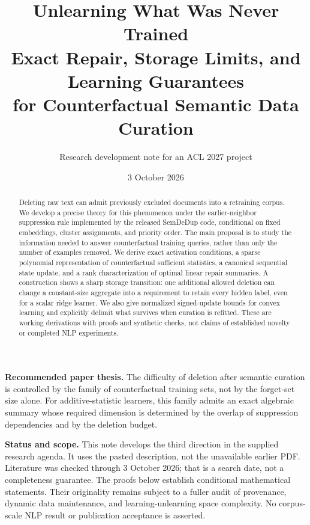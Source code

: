 \documentclass[11pt,a4paper]{article}
\title{\color{ink}\textbf{Unlearning What Was Never Trained}\\[5pt]\Large Exact Repair, Storage Limits, and Learning Guarantees\\for Counterfactual Semantic Data Curation}
\author{Research development note for an ACL 2027 project}
\date{3 October 2026}
\theoremstyle{definition}\newtheorem{definition}[theorem]{Definition}
\begin{document}
\maketitle
\begin{abstract}
Deleting raw text can admit previously excluded documents into a retraining corpus. We develop a precise theory for this phenomenon under the earlier-neighbor suppression rule implemented by the released SemDeDup code, conditional on fixed embeddings, cluster assignments, and priority order. The main proposal is to study the information needed to answer counterfactual training queries, rather than only the number of examples removed. We derive exact activation conditions, a sparse polynomial representation of counterfactual sufficient statistics, a canonical sequential state update, and a rank characterization of optimal linear repair summaries. A construction shows a sharp storage transition: one additional allowed deletion can change a constant-size aggregate into a requirement to retain every hidden label, even for a scalar ridge learner. We also give normalized signed-update bounds for convex learning and explicitly delimit what survives when curation is refitted. These are working derivations with proofs and synthetic checks, not claims of established novelty or completed NLP experiments.
\end{abstract}

\textbf{Recommended paper thesis.} The difficulty of deletion after semantic curation is controlled by the family of counterfactual training sets, not by the forget-set size alone. For additive-statistic learners, this family admits an exact algebraic summary whose required dimension is determined by the overlap of suppression dependencies and by the deletion budget.

\textbf{Status and scope.} This note develops the third direction in the supplied research agenda. It uses the pasted description, not the unavailable earlier PDF. Literature was checked through 3 October 2026; that is a search date, not a completeness guarantee. The proofs below establish conditional mathematical statements. Their originality remains subject to a fuller audit of provenance, dynamic data maintenance, and learning-unlearning space complexity. No corpus-scale NLP result or publication acceptance is asserted.

\newpage
\tableofcontents
\newpage
\end{document}
